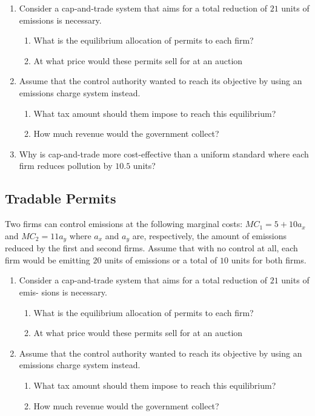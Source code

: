 \documentclass[11pt]{article}
\begin{document}
\begin{enumerate}
  \item Consider a cap-and-trade system that aims for a total reduction of $21$ units of emissions is necessary. 
  \begin{enumerate}
    \item What is the equilibrium allocation of permits to each firm?
    \item At what price would these permits sell for at an auction
  \end{enumerate}

  \item Assume that the control authority wanted to reach its objective by using an emissions
  charge system instead.
  \begin{enumerate}
    \item What tax amount should them impose to reach this equilibrium?
    \item How much revenue would the government collect?
  \end{enumerate}

  \item Why is cap-and-trade more cost-effective than a uniform standard where each firm reduces pollution by $10.5$ units?
\end{enumerate}

\subsection*{Tradable Permits}


Two firms can control emissions at the following marginal costs: $ MC_1 = 5 + 10 a_x $ and $MC_2 = 11 a_y$ where $a_x$ and $a_y$ are, respectively, the amount of emissions reduced by the first and second firms. Assume that with no control at all, each firm would be emitting $20$ units of emissions or a total of $10$ units for both firms.

\begin{enumerate}
  \item Consider a cap-and-trade system that aims for a total reduction of $21$ units of emis-
  sions is necessary. 
  \begin{enumerate}
    \item What is the equilibrium allocation of permits to each firm?
    \item At what price would these permits sell for at an auction
  \end{enumerate}

  \item Assume that the control authority wanted to reach its objective by using an emissions
  charge system instead.
  \begin{enumerate}
    \item What tax amount should them impose to reach this equilibrium?
    \item How much revenue would the government collect?
  \end{enumerate}
\end{enumerate}
\end{document}
